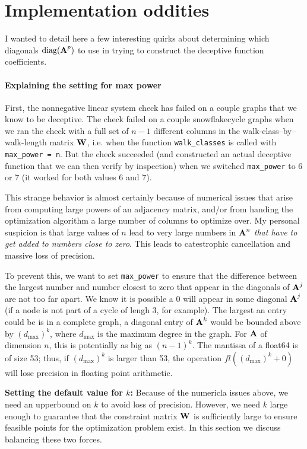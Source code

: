 \documentclass[a4paper,10pt]{article}
\providecommand{\dmax}{d_{\max}}
\begin{document}
\section{Implementation oddities}
I wanted to detail here a few interesting quirks about determining which diagonals $\operatorname{diag}(\textbf{A}^{p})$ to use in trying to construct the deceptive function coefficients.

\paragraph{Explaining the setting for max power}
First, the nonnegative linear system check has failed on a couple graphs that we know to be deceptive. The check failed on a couple snowflakecycle graphs when we ran the check with a full set of $n-1$ different columns in the walk-class--by--walk-length matrix $\textbf{W}$, i.e. when the function \verb|walk_classes| is called with \verb|max_power = n|.
But the check succeeded (and constructed an actual deceptive function that we can then verify by inspection) when we switched \verb|max_power| to 6 or 7 (it worked for both values 6 and 7).

This strange behavior is almost certainly because of numerical issues that arise from computing large powers of an adjacency matrix, and/or from handing the optimization algorithm a large number of columns to optimize over.
My personal suspicion is that large values of $n$ lead to very large numbers in $\textbf{A}^n$ \emph{that have to get added to numbers close to zero}. This leads to catestrophic cancellation and massive loss of precision.

To prevent this, we want to set \verb|max_power| to ensure that the difference between the largest number and number closest to zero that appear in the diagonals of $\textbf{A}^{j}$ are not too far apart. We know it is possible a 0 will appear in some diagonal $\textbf{A}^j$ (if a node is not part of a cycle of lengh 3, for example). The largest an entry could be is in a complete graph, a diagonal entry of $\textbf{A}^k$ would be bounded above by $(\dmax)^k$, where $\dmax$ is the maximum degree in the graph. For $\textbf{A}$ of dimension $n$, this is potentially as big as $(n-1)^k$.
The mantissa of a float64 is of size 53; thus, if $(\dmax)^k$ is larger than 53, the operation $fl\left((\dmax)^k + 0\right)$ will lose precision in floating point arithmetic.

\textbf{Setting the default value for $k$:}
Because of the numericla issues above, we need an upperbound on $k$ to avoid loss of precision. However, we need $k$ large enough to guarantee that the constraint matrix $\textbf{W}$ is sufficiently large to ensure feasible points for the optimization problem exist. In this section we discuss balancing these two forces.
\end{document}

